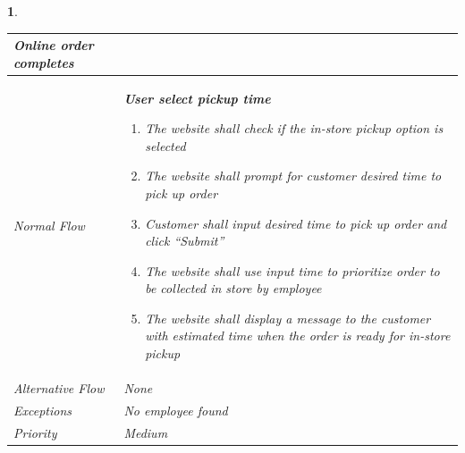 \documentclass{scrreprt}
\theoremstyle{funreq}
\newtheorem{funreq}{}
\begin{document}
\begin{funreq}
\begin{table}[H]
{\begin{tabularx}{\columnwidth}{|l|X|}
					Online order completes
					\\ \hline Normal Flow &
					\bfseries{User select pickup time}\normalfont\newline 
					\begin{enumerate}
					    \item The website shall check if the in-store pickup option is selected
					    \item The website shall prompt for customer desired time to pick up order
                        \item Customer shall input desired time to pick up order and click “Submit”
                        \item The website shall use input time to prioritize order to be collected in store by employee
                        \item The website shall display a message to the customer with estimated time when the order is ready for in-store pickup
					\end{enumerate}
					\\ \hline Alternative Flow & 
					None
					\\ \hline Exceptions & 
					No employee found
					\\ \hline Priority & 
					Medium
					\\ \hline
				\end{tabularx}%
			}
		\end{table}
	\end{funreq}

\end{document}
